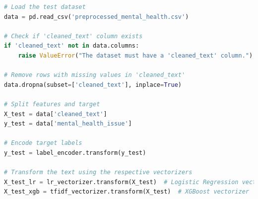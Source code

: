 \begin{tcolorbox}[colback=gray!5!white, colframe=gray!80!black, boxrule=0.5pt, title=Data Preparation]
\begin{lstlisting}[language=Python]
# Load the test dataset
data = pd.read_csv('preprocessed_mental_health.csv')

# Check if 'cleaned_text' column exists
if 'cleaned_text' not in data.columns:
    raise ValueError("The dataset must have a 'cleaned_text' column.")

# Remove rows with missing values in 'cleaned_text'
data.dropna(subset=['cleaned_text'], inplace=True)

# Split features and target
X_test = data['cleaned_text']
y_test = data['mental_health_issue']

# Encode target labels
y_test = label_encoder.transform(y_test)

# Transform the text using the respective vectorizers
X_test_lr = lr_vectorizer.transform(X_test)  # Logistic Regression vectorizer
X_test_xgb = tfidf_vectorizer.transform(X_test)  # XGBoost vectorizer
\end{lstlisting}
\end{tcolorbox}
    
